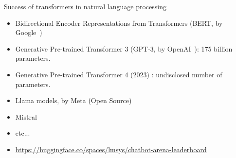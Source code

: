 \documentclass[xcolor=pdftex,dvipsnames,table,mathserif]{beamer}
\newcommand{\source}[1]{\begin{textblock*}{4cm}(8.7cm,8.6cm)
    \begin{beamercolorbox}[ht=0.5cm,right]{framesource}
      \usebeamerfont{framesource}\usebeamercolor[fg]{framesource} Credits: {#1}
    \end{beamercolorbox}
\end{textblock*}}
\begin{document}








\begin{frame}{Success of transformers in natural language processing}

  \begin{itemize}
  \item Bidirectional Encoder Representations from Transformers (BERT, by Google~\cite{brown_language_2020})
  \item Generative Pre-trained Transformer 3 (GPT-3, by OpenAI~\cite{devlin_bert_2019}): 175 billion parameters.
  \item Generative Pre-trained Transformer 4 (2023) : undisclosed number of parameters.
    \item Llama models, by Meta (Open Source)
    \item Mistral
    \item etc...
    \item \url{https://huggingface.co/spaces/lmsys/chatbot-arena-leaderboard}

  \end{itemize}
\end{frame}
\end{document}
